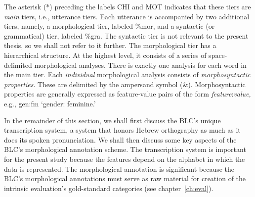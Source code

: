 The asterisk (*) preceding the labels CHI and \textsf{MOT} 
indicates that these tiers are \emph{main} tiers, i.e.,  
utterance tiers. Each utterance is accompanied by two 
additional tiers, 
namely, a morphological tier, labeled \textsf{\%mor}, 
and a syntactic (or grammatical) tier, labeled \textsf{\%gra}. 
The syntactic tier is not relevant to the present thesis,
so we shall not refer to it further. The morphological tier 
has a hierarchical structure. At the highest level, it consists of a 
series of space-delimited morphological analyses, 
There is exactly one analysis for each word in the main tier.  
Each \emph{individual} morphological analysis consists
of \textit{morphosyntactic properties}. These are delimited by the 
ampersand symbol (\textsf{\&}). Morphosyntactic properties are 
generally expressed as feature-value pairs of the 
form \textsf{\textit{feature}:\textit{value}}, e.g., 
\textsf{gen:fm} `gender: feminine.' 

In the remainder of this section, we shall first discuss the 
\ac{BLC}'s unique transcription system, a system that 
honors Hebrew orthography as much as it does its spoken 
pronunciation. We shall then discuss some key aspects of 
the \ac{BLC}'s morphological annotation scheme. The 
transcription system is important for the present study 
because the features
depend on the alphabet in which the data is represented.
 The morphological annotation 
is significant because  the BLC's morphological annotations must 
serve as raw material for creation of  the intrinsic evaluation's 
gold-standard categories (see chapter~\ref{ch:eval}). 

